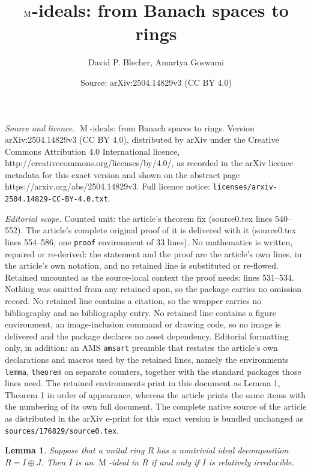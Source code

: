 \documentclass[10pt,a4paper]{amsart}
\title{$\m$-ideals: from Banach spaces to rings}
\author{David P. Blecher, Amartya Goswami}
\date{Source: arXiv:2504.14829v3 (CC BY 4.0)}
\newtheorem{lemma}{Lemma}
\DeclareMathOperator{\m}{M}
\begin{document}
\maketitle

\noindent\emph{Source and licence.} $\m$-ideals: from Banach spaces to rings. Version arXiv:2504.14829v3 (CC BY 4.0), distributed by arXiv under the Creative Commons Attribution 4.0 International licence, http://creativecommons.org/licenses/by/4.0/, as recorded in the arXiv licence metadata for this exact version and shown on the abstract page https://arxiv.org/abs/2504.14829v3. Full licence notice: \texttt{licenses/arxiv-2504.14829-CC-BY-4.0.txt}.\par\smallskip

\noindent\textit{Editorial scope.} Counted unit: the article's theorem fix (source0.tex lines 540--552). The article's complete original proof of it is delivered with it (source0.tex lines 554--586, one \texttt{proof} environment of 33 lines). No mathematics is written, repaired or re-derived: the statement and the proof are the article's own lines, in the article's own notation, and no retained line is substituted or re-flowed.  Retained uncounted as the source-local context the proof needs: lines 531--534.  Nothing was omitted from any retained span, so the package carries no omission record.  No retained line contains a citation, so the wrapper carries no bibliography and no bibliography entry.  No retained line contains a figure environment, an image-inclusion command or drawing code, so no image is delivered and the package declares no asset dependency.  Editorial formatting only, in addition: an AMS \texttt{amsart} preamble that restates the article's own declarations and macros used by the retained lines, namely the environments \texttt{lemma}, \texttt{theorem} on separate counters, together with the standard packages those lines need.  The retained environments print in this document as Lemma 1, Theorem 1 in order of appearance, whereas the article prints the same items with the numbering of its own full document.  The complete native source of the article as distributed in the arXiv e-print for this exact version is bundled unchanged as \texttt{sources/176829/source0.tex}.
\begin{lemma}
\label{pros}
Suppose that a unital ring $R$ has a nontrivial ideal decomposition $R = I \oplus J$.  Then $I$ is an $\m$-ideal in $R$ if and only if $I$ is relatively irreducible.
\end{lemma}
\end{document}
